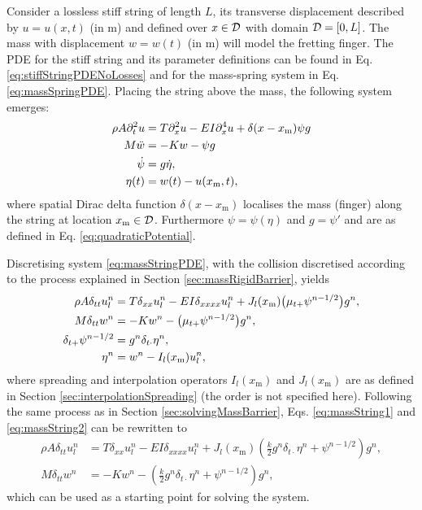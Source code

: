 Consider a lossless stiff string of length $L$, its transverse displacement described by $u = u(x,t)$ (in m) and defined over $x\in \mathcal{D}$ with domain $\mathcal{D} = [0, L]$. The mass with displacement $w = w(t)$ (in m) will model the fretting finger. The PDE for the stiff string and its parameter definitions can be found in Eq. \eqref{eq:stiffStringPDENoLosses} and for the mass-spring system in Eq. \eqref{eq:massSpringPDE}. Placing the string above the mass, the following system emerges:
\begin{subequations}\label{eq:massStringPDE}
\begin{align}   
    \rho A \partial_t^2 u & =T\partial_x^2 u - EI\partial_x^4 u + \delta(x-x_\text{m}) \psi g \label{eq:massStringPDE1}\\
    M \ddot w &=-Kw - \psi g\label{eq:massStringPDE2}\\
    \dot\psi &= g \dot\eta,\label{eq:massStringPDE3}\\
    \eta(t) &= w(t) - u(x_\text{m}, t),\label{eq:massStringPDE4}
\end{align}
\end{subequations}
where spatial Dirac delta function $\delta(x-x_\text{m})$ localises the mass (finger) along the string at location $x_\text{m} \in \mathcal{D}$. Furthermore $\psi = \psi(\eta)$ and $g=\psi'$ and are as defined in Eq. \eqref{eq:quadraticPotential}. 

Discretising system \eqref{eq:massStringPDE}, with the collision discretised according to the process explained in Section \ref{sec:massRigidBarrier}, yields
\begin{subequations}
    \begin{align}   
        \rho A \delta_{tt}u^n_l & =T\delta_{xx}u^n_l - EI\delta_{xxxx}u_l^n + J_l(x_\text{m}) \big(\mu_{t+}\psi^{n-1/2}\big)g^n, \label{eq:massString1}\\
        M \delta_{tt}w^n &=-Kw^n - \big(\mu_{t+}\psi^{n-1/2}\big)g^n,\label{eq:massString2}\\
        \delta_{t+}\psi^{n-1/2} &= g^n\delta_{t\cdot}\eta^n,\label{eq:massString3}\\
        \eta^n &= w^n - I_l(x_\text{m})u_l^n,\label{eq:massString4}
    \end{align}
\end{subequations}
where spreading and interpolation operators $I_l(x_\text{m})$ and $J_l(x_\text{m})$ are as defined in Section \ref{sec:interpolationSpreading} (the order is not specified here). Following the same process as in Section \ref{sec:solvingMassBarrier}, Eqs. \eqref{eq:massString1} and \eqref{eq:massString2} can be rewritten to 
\begin{subequations}\label{eq:massStringComb}
    \begin{align}
        \rho A \delta_{tt}u^n_l & =T\delta_{xx}u^n_l - EI\delta_{xxxx}u_l^n + J_l(x_\text{m}) \left(\frac{k}{2}g^n\delta_{t\cdot}\eta^n + \psi^{n-1/2}\right)g^n,\label{eq:massStringComb1}\\
        M \delta_{tt}w^n &=-Kw^n - \left(\frac{k}{2}g^n\delta_{t\cdot}\eta^n + \psi^{n-1/2}\right)g^n,\label{eq:massStringComb2}
    \end{align}
\end{subequations}
which can be used as a starting point for solving the system.

